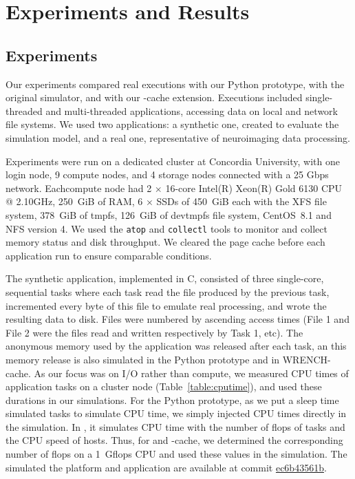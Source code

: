 \chapter{Experiments and Results}
\label{experiment}


\section{Experiments}

Our experiments compared real executions with our Python prototype, with the 
original \wrench simulator, and with our \wrench-cache extension. 
Executions included single-threaded and multi-threaded applications, 
accessing data on local and network file systems. 
We used two applications: a synthetic one, created to evaluate the simulation model, 
and a real one, representative of neuroimaging data processing.

Experiments were run on a dedicated cluster at Concordia University, with one 
login node, 9 compute nodes, and 4 storage nodes connected with a 25 Gbps network. 
Eachcompute node had 2 $\times$ 16-core Intel(R) Xeon(R) Gold 6130 CPU @ 2.10GHz, 
250~GiB of RAM, 6 $\times$ SSDs of 450~GiB each with the XFS file system, 
378~GiB of tmpfs, 126~GiB of devtmpfs file system, CentOS~8.1 and NFS version 4. 
We used the \texttt{atop} and \texttt{collectl} tools to monitor and collect memory status
and disk throughput. 
We cleared the page cache before each application run to ensure comparable conditions.
    
The synthetic application, implemented in C, consisted of three single-core,
sequential tasks where each task read the file produced by the previous task, 
incremented every byte of this file to emulate real processing, 
and wrote the resulting data to disk. 
Files were numbered by ascending access times (File 1 and File 2 were the files 
read and written respectively by Task 1, etc).
The anonymous memory used by the application was released after each task, 
an this memory release is also simulated in the Python prototype and 
in WRENCH-cache. 
As our focus was on I/O rather than compute, we measured CPU times 
of application tasks on a cluster node (Table~\ref{table:cputime}), and 
used these durations in our simulations. 
For the Python prototype, as we put a sleep time simulated tasks to 
simulate CPU time, we simply injected CPU times directly in the simulation. 
In \wrench, it simulates CPU time with the number of flops of tasks 
and the CPU speed of hosts.
Thus, for \wrench and \wrench-cache, we determined the corresponding 
number of flops on a 1~Gflops CPU and used these values in the simulation. 
The simulated the platform and application are available at commit 
\href{https://github.com/wrench-project/wrench/tree/ec6b43561b95977002258c0fe37a4ecad8f1d33f/examples/basic-examples/io-pagecache}{ec6b43561b}.

